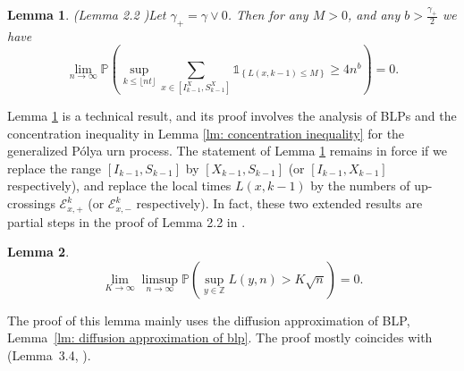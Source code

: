 \documentclass[twoside,12pt, a4paper]{article}
\newtheorem{lemma}{Lemma}[section]
\numberwithin{equation}{section}
\theoremstyle{remark}
\newcommand{\comment}[1]{\textcolor{blue}{(Comment: #1)}}
\begin{document}
	\begin{lemma}(Lemma 2.2 \cite{KMP23})\label{lm: number of rarely visit sites}
		Let $\gamma_+ = \gamma \vee 0$. Then for any $M>0$, and any $b>\frac{\gamma_+}{2}$ we have
		$$
		\lim_{n\to\infty} \mathbb{P}\left(\sup_{k\leq\lfloor nt \rfloor}  \sum_{x\in [I^X_{k-1}, S^X_{k-1}]} \mathbb{1}_{\left\{ L(x,k-1) \leq M \right\}} \geq 4n^b \right) = 0.
		$$
		
	\end{lemma}	
	Lemma \ref{lm: number of rarely visit sites} is a technical result, and its proof involves the analysis of BLPs and the concentration inequality in Lemma \ref{lm: concentration inequality} for the generalized P\'{o}lya urn process. The statement of Lemma \ref{lm: number of rarely visit sites} remains in force if we replace the range $[I_{k-1}, S_{k-1}]$ by $[X_{k - 1},S_{k - 1}]$ (or $[I_{k-1},X_{k - 1}]$ respectively), and replace the local times $L(x,k-1)$ by the numbers of up-crossings $\mathcal{E}^{k}_{x,+}$ (or $\mathcal{E}^{k}_{x,-}$ respectively). In fact, these two extended results are partial steps in the proof of Lemma 2.2 in \cite{KMP23}.   
	
	\begin{lemma}
		\label{lm: uniform control of local time}
		\[
		\lim_{K \to  \infty } \limsup_{n \to \infty } \mathbb{P}\left( \sup_{y \in \mathbb{Z}} L\left( y, n \right) > K \sqrt{n}  \right) = 0
		.\] 
	\end{lemma}
	The proof of this lemma mainly uses the diffusion approximation of BLP, Lemma~\ref{lm: diffusion approximation of blp}. The proof mostly coincides with (Lemma~3.4, \cite{KP16}). 
	
\end{document}
